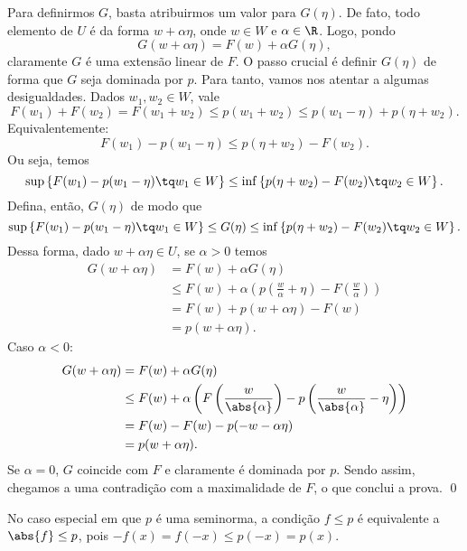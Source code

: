 Para definirmos \( G \), basta atribuirmos um valor para \( G(\eta) \).
De fato, todo elemento de \( U \) é da forma \( w + \alpha \eta \), onde \( w \in W \) e \( \alpha \in \R \).
Logo, pondo \[
    G(w + \alpha \eta) = F(w) + \alpha G(\eta)
,\]
claramente \( G \) é uma extensão linear de \( F \).
O passo crucial é definir \( G(\eta) \) de forma que \( G \) seja dominada por \( p \).
Para tanto, vamos nos atentar a algumas desigualdades.
Dados \( w_{ 1 }, w_{ 2 } \in W \), vale \[
    F(w_{ 1 }) + F(w_{ 2 }) =
    F(w_{ 1 } + w_{ 2 }) \leq
    p(w_{ 1 } + w_{ 2 }) \leq
    p(w_{ 1 } - \eta) + p(\eta + w_{ 2 })
.\]
Equivalentemente: \[
    F(w_{ 1 }) - p(w_{ 1 } - \eta) \leq p(\eta + w_{ 2 }) - F(w_{ 2 })
.\]
Ou seja, temos \[
    \sup \left\{ F(w_{ 1 }) - p(w_{ 1 } - \eta) \tq w_{ 1 } \in W \right\} \leq
    \inf \left\{ p(\eta + w_{ 2 }) - F(w_{ 2 }) \tq w_{ 2 } \in W \right\}
.\]
Defina, então, \( G(\eta) \) de modo que \[
    \sup \left\{ F(w_{ 1 }) - p(w_{ 1 } - \eta) \tq w_{ 1 } \in W \right\} \leq
    G(\eta) \leq
    \inf \left\{ p(\eta + w_{ 2 }) - F(w_{ 2 }) \tq w_{ 2 } \in W \right\}
.\]
Dessa forma, dado \( w + \alpha \eta \in U \), se \( \alpha > 0 \) temos
\begin{align*}
    G(w + \alpha \eta) &=
    F(w) + \alpha G(\eta) \\
    &\leq F(w) + \alpha \left( 
        p \left( \frac{ w }{ \alpha } + \eta \right) - F \left(  \frac{ w }{ \alpha }  \right)
    \right) \\
    &= F(w) + p(w + \alpha \eta) - F(w) \\
    &= p(w + \alpha \eta)
.\end{align*}
Caso \( \alpha < 0 \):
\begin{align*}
    G(w + \alpha \eta) &=
    F(w) + \alpha G(\eta) \\
    &\leq F(w) + \alpha \left( 
        F \left( \frac{ w }{ \abs{ \alpha } } \right) -
        p \left( \frac{ w }{ \abs{ \alpha } } - \eta \right)
    \right) \\
    &= F(w) - F(w) - p(-w - \alpha \eta) \\
    &= p(w + \alpha \eta)
.\end{align*}
Se \( \alpha = 0 \), \( G \) coincide com \( F \) e claramente é dominada por \( p \).
Sendo assim, chegamos a uma contradição com a maximalidade de \( F \), o que conclui a prova. \qed

No caso especial em que \( p \) é uma seminorma, a condição \( f \leq p \) é equivalente a \( \abs{ f } \leq p \), pois \( -f(x) = f(-x) \leq p(-x) = p(x) \).


